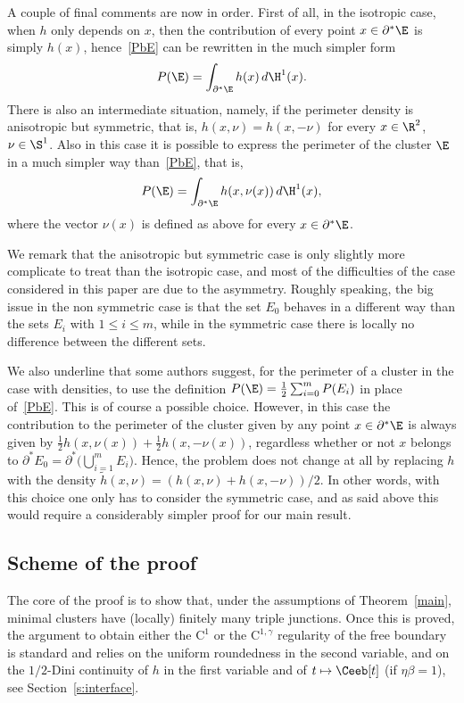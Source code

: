 A couple of final comments are now in order. First of all, in the isotropic case, \ie when $h$ only depends on $x$, then the contribution of every point $x\in\partial^*\E$ is simply $h(x)$, hence~\eqref{PbE} can be rewritten in the much simpler form
\[
P(\E) = \int_{\partial^*\E} h(x)\, d\H^1(x).
\]
There is also an intermediate situation, namely, if the perimeter density is anisotropic but symmetric, that is, $h(x,\nu)=h(x,-\nu)$ for every $x\in\R^2$, $\nu\in\S^1$. Also in this case it is possible to express the perimeter of the cluster $\E$ in a much simpler way than~\eqref{PbE}, that is,
\[
P(\E) = \int_{\partial^*\E} h(x,\nu(x))\, d\H^1(x),
\]
where the vector $\nu(x)$ is defined as above for every $x\in\partial^*\E$.

We remark that the anisotropic but symmetric case is only slightly more complicate to treat than the isotropic case, and most of the difficulties of the case considered in this paper are due to the asymmetry. Roughly speaking, the big issue in the non symmetric case is that the set $E_0$ behaves in a different way than the sets $E_i$ with $1\leq i \leq m$, while in the symmetric case there is locally no difference between the different sets.

We also underline that some authors suggest, for the perimeter of a cluster in the case with densities, to use the definition $P(\E) = \frac 12 \sum_{i=0}^m P(E_i)$ in place of~\eqref{PbE}. This is of course a possible choice. However, in this case the contribution to the perimeter of the cluster given by any point $x\in\partial^*\E$ is always given by $\frac 12 h(x,\nu(x))+ \frac 12 h(x,-\nu(x))$, regardless whether or not $x$ belongs to $\partial^* E_0 = \partial^* \big(\bigcup_{i=1}^m E_i\big)$. Hence, the problem does not change at all by replacing $h$ with the density $\tilde h(x,\nu)=(h(x,\nu)+h(x,-\nu))/2$. In other words, with this choice one only has to consider the symmetric case, and as said above this would require a considerably simpler proof for our main result.\enlargethispage{.5\baselineskip}%

\subsection{Scheme of the proof\label{sec:exproof}}

The core of the proof is to show that, under the assumptions of Theorem~\ref{main}, minimal clusters have (locally) finitely many triple junctions.
Once this is proved, the argument to obtain either the $\mathrm{C}^1$ or the $\mathrm{C}^{1,\gamma}$ regularity of the free boundary is standard and relies on the uniform roundedness in the second variable, and on the $1/2$-Dini continuity of $h$ in the first variable and of $t\mapsto \Ceeb[t]$
(if $\eta\beta=1$), see Section~\ref{s:interface}.

